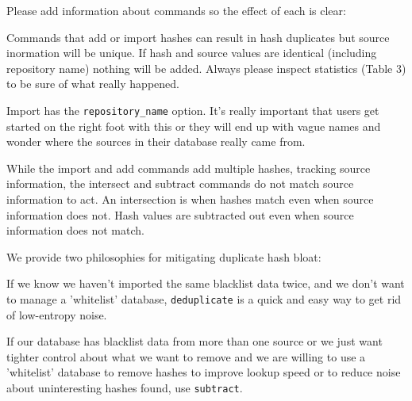 \documentclass[12pt,twoside]{article}
\begin{document}
Please add information about commands so the effect of each is clear:
\begin{compactitem}
\item Commands that add or import hashes can result in hash duplicates
but source inormation will be unique.
If hash and source values are identical (including repository name)
nothing will be added.
Always please inspect statistics (Table 3) to be sure of what really happened.
\item Import has the \texttt{repository\_name} option.
It's really important that users get started on the right foot with this
or they will end up with vague names and wonder where the sources
in their database really came from.
\item While the import and add commands add multiple hashes,
tracking source information,
the intersect and subtract commands do not match source information to act.
An intersection is when hashes match even when source information does not.
Hash values are subtracted out even when source information does not match.
\item We provide two philosophies for mitigating duplicate hash bloat:
  \begin{compactitem}
  \item If we know we haven't imported the same blacklist data twice,
  and we don't want to manage a 'whitelist' database,
  \texttt{deduplicate} is a quick and easy way to get rid of low-entropy noise.
  \item If our database has blacklist data from more than one source
  or we just want tighter control about what we want to remove
  and we are willing to use a 'whitelist' database
  to remove hashes to improve lookup speed
  or to reduce noise about uninteresting hashes found,
  use \texttt{subtract}.
  \end{compactitem}
\end{compactitem}
\end{document}
